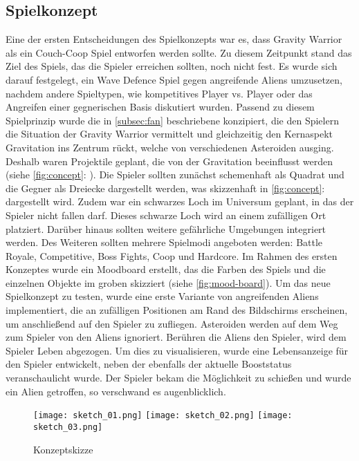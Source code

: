 \documentclass[11pt]{scrartcl}
\begin{document}
\subsection{Spielkonzept}
Eine der ersten Entscheidungen des Spielkonzepts war es, dass Gravity Warrior als ein Couch-Coop Spiel entworfen werden sollte. Zu diesem Zeitpunkt stand das Ziel des Spiels, das die Spieler erreichen sollten, noch nicht fest. Es wurde sich darauf festgelegt, ein Wave Defence Spiel gegen angreifende Aliens umzusetzen, nachdem andere Spieltypen, wie kompetitives Player vs. Player oder das Angreifen einer gegnerischen Basis diskutiert wurden.
Passend zu diesem Spielprinzip wurde die in \autoref{subsec:fan} beschriebene  konzipiert, die den Spielern die Situation der Gravity Warrior vermittelt und gleichzeitig den Kernaspekt Gravitation ins Zentrum rückt, welche von verschiedenen Asteroiden ausging. Deshalb waren Projektile geplant, die von der Gravitation beeinflusst werden (siehe \autoref{fig:concept}: ). 
Die Spieler sollten zunächst schemenhaft als Quadrat und die Gegner als Dreiecke dargestellt werden, was skizzenhaft in \autoref{fig:concept}:  dargestellt wird. Zudem war ein schwarzes Loch im Universum geplant, in das der Spieler nicht fallen darf. Dieses schwarze Loch wird an einem zufälligen Ort platziert. Darüber hinaus sollten weitere gefährliche Umgebungen integriert werden. Des Weiteren sollten mehrere Spielmodi angeboten werden: Battle Royale, Competitive, Boss Fights, Coop und Hardcore. Im Rahmen des ersten Konzeptes wurde ein Moodboard erstellt, das die Farben des Spiels und die einzelnen Objekte im groben skizziert (siehe \autoref{fig:mood-board}).
Um das neue Spielkonzept zu testen, wurde eine erste Variante von angreifenden Aliens implementiert, die an zufälligen Positionen am Rand des Bildschirms erscheinen, um anschließend auf den Spieler zu zufliegen. Asteroiden werden auf dem Weg zum Spieler von den Aliens ignoriert. Berühren die Aliens den Spieler, wird dem Spieler Leben abgezogen. Um dies zu visualisieren, wurde eine Lebensanzeige für den Spieler entwickelt, neben der ebenfalls der aktuelle Booststatus veranschaulicht wurde.
Der Spieler bekam die Möglichkeit zu schießen und wurde ein Alien getroffen, so verschwand es augenblicklich.

\begin{figure}[htp]
 \centering
 \texttt{[image: sketch\_01.png]}\hfill
 \texttt{[image: sketch\_02.png]}\hfill
 \texttt{[image: sketch\_03.png]}
 \caption{Konzeptskizze}
 \label{fig:concept}
\end{figure}
\end{document}
